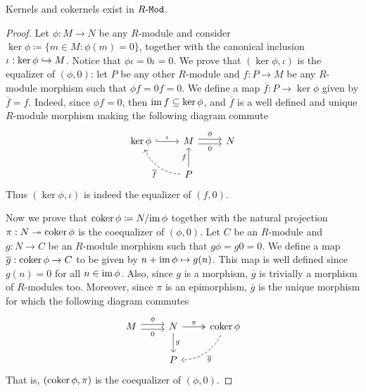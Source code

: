 \begin{lemma}
\label{lem:ker-coker-exist-in-R-mod}
Kernels and cokernels exist in \({R\text{-}\texttt{Mod}}\).
\end{lemma}

\begin{proof}
Let \(\phi: M \to N\) be any \(R\)-module and consider
\(\ker \phi \coloneq \{m \in M \colon \phi(m) = 0\}\), together with the
canonical inclusion \(\iota: \ker \phi \hookrightarrow M\). Notice that
\(\phi \iota = 0 \iota = 0\). We prove that \((\ker \phi, \iota)\) is the
equalizer of \((\phi, 0)\): let \(P\) be any other \(R\)-module and
\(f: P \to M\) be any \(R\)-module morphism such that \(\phi f = 0 f = 0\). We
define a map \(\overline{f}: P \to \ker \phi\) given by \(\overline{f} = f\).
Indeed, since \(\phi f = 0\), then \(\operatorname{im} f \subseteq \ker \phi\), and
\(\overline{f}\) is a well defined and unique \(R\)-module morphism making the
following diagram commute
\[
\begin{tikzcd}
\ker \phi \ar[r, hook, "\iota"]
&M \ar[r, shift left, "\phi"] \ar[r, shift right, "0"']
&N \\
&P \ar[u, "f"] \ar[ul, dashed, bend left, "\overline{f}"] &
\end{tikzcd}
\]
Thus \((\ker \phi, \iota)\) is indeed the equalizer of \((f, 0)\).

Now we prove that \(\operatorname{coker} \phi \coloneq N/{\operatorname{im} \phi}\) together with the
natural projection \(\pi: N \twoheadrightarrow \operatorname{coker} \phi\) is the coequalizer of
\((\phi, 0)\). Let \(C\) be an \(R\)-module and \(g: N \to C\) be an
\(R\)-module morphism such that \(g \phi = g 0 = 0\). We define a map
\(\overline{g}: \operatorname{coker} \phi \to C\) to be given by \(n + \operatorname{im} \phi \mapsto
g(n)\). This map is well defined since \(g(n) = 0\) for all \(n \in \operatorname{im}
\phi\). Also, since \(g\) is a morphism, \(\overline{g}\) is trivially a
morphism of \(R\)-modules too. Moreover, since \(\pi\) is an epimorphism,
\(\overline{g}\) is the unique morphism for which the following diagram commutes
\[
\begin{tikzcd}
M \ar[r, shift left, "\phi"] \ar[r, shift right, "0"']
& N \ar[r, two heads, "\pi"] \ar[d, "g"]
&\coker \phi \ar[dl, bend left, dashed, "\overline{g}"]
\\
&P &
\end{tikzcd}
\]
That is, \((\operatorname{coker} \phi, \pi)\) is the coequalizer of \((\phi, 0)\).
\end{proof}

